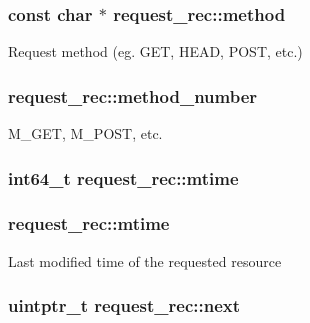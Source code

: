 \subsubsection[{\texorpdfstring{method}{method}}]{\setlength{\rightskip}{0pt plus 5cm}const char $\ast$ request\+\_\+rec\+::method}\hypertarget{structrequest__rec_a54de55544c4c4c25d67a08980184c653}{}\label{structrequest__rec_a54de55544c4c4c25d67a08980184c653}
Request method (eg. G\+ET, H\+E\+AD, P\+O\+ST, etc.) 
\subsubsection[{\texorpdfstring{method\+\_\+number}{method_number}}]{ request\+\_\+rec\+::method\+\_\+number}\hypertarget{structrequest__rec_a5d11eb89be0765988fde175e0d5ccfb7}{}\label{structrequest__rec_a5d11eb89be0765988fde175e0d5ccfb7}
M\+\_\+\+G\+ET, M\+\_\+\+P\+O\+ST, etc. 
\subsubsection[{\texorpdfstring{mtime}{mtime}}]{\setlength{\rightskip}{0pt plus 5cm}int64\+\_\+t request\+\_\+rec\+::mtime}\hypertarget{structrequest__rec_a25d43eb990fee28e18daefe42bf1d996}{}\label{structrequest__rec_a25d43eb990fee28e18daefe42bf1d996}
\subsubsection[{\texorpdfstring{mtime}{mtime}}]{ request\+\_\+rec\+::mtime}\hypertarget{structrequest__rec_a3fa37c58bc8ca681e0f44957d9c5d823}{}\label{structrequest__rec_a3fa37c58bc8ca681e0f44957d9c5d823}
Last modified time of the requested resource 
\subsubsection[{\texorpdfstring{next}{next}}]{\setlength{\rightskip}{0pt plus 5cm}uintptr\+\_\+t request\+\_\+rec\+::next}\hypertarget{structrequest__rec_a9ad319bcc7cc9d2eceb1cf6b5dbf4fd9}{}\label{structrequest__rec_a9ad319bcc7cc9d2eceb1cf6b5dbf4fd9}
